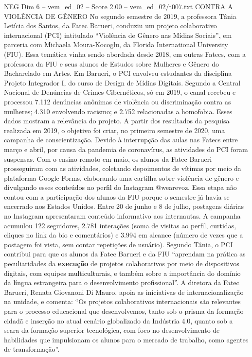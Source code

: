 \begin{textsample}{NEG Dim 6 – vem\_ed\_02 – Score 2.00 – vem\_ed\_02/t007.txt}  \label{ex:f6_neg_056}
CONTRA A VIOLÊNCIA DE GÊNERO No segundo semestre de 2019, a professora Tânia Letícia dos Santos, da Fatec Barueri, conduziu um projeto colaborativo internacional (PCI) intitulado “Violência de Gênero nas Mídias Sociais”, em parceria com Michaela Moura-Kocoglu, da Florida International University (FIU).
Essa temática vinha sendo abordada desde 2018, em outras Fatecs, com a professora da FIU e seus alunos de Estudos sobre Mulheres e Gênero do Bacharelado em Artes.
Em Barueri, o PCI envolveu estudantes da disciplina Projeto Integrador I, do curso de Design de Mídias Digitais.
Segundo a Central Nacional de Denúncias de Crimes Cibernéticos, só em 2019, o canal recebeu e processou 7.112 denúncias anônimas de violência ou discriminação contra as mulheres; 4.310 envolvendo racismo; e 2.752 relacionadas a homofobia.
Esses dados mostram a relevância do projeto.
A partir dos resultados da pesquisa realizada em 2019, o objetivo foi criar, no primeiro semestre de 2020, uma campanha de conscientização.
Devido à interrupção das aulas nas Fatecs entre março e abril, por causa da pandemia de coronavírus, as atividades do PCI foram suspensas.
Com o ensino remoto em maio, os alunos da Fatec Barueri prosseguiram com as atividades, coletando depoimentos de vítimas por meio da plataforma Google Forms, elaborando uma cartilha sobre violência de gênero e divulgando esses conteúdos no perfil do Instagram @wearevoz.
Essa etapa não contou com a participação dos alunos da FIU porque o semestre já havia se encerrado nos Estados Unidos.
Entre 20 de junho e 8 de julho, postagens diárias no Instagram apresentaram conteúdo informativo aos internautas.
A campanha acumulou 122 seguidores, 2.781 interações (soma de visitas ao perfil, curtidas, cliques no link da bio e comentários) e 3.994 em alcance (número de vezes que a postagem foi vista, sem contar repetições de usuário).
Segundo Tânia, o PCI contribui para que os alunos da Fatec Barueri e da FIU “aprendam na prática as peculiaridades da \textbf{execução} de projetos colaborativos por meio de dispositivos digitais, com equipes multiculturais, e também sobre a importância do domínio da língua estrangeira para o desenvolvimento profissional”.
A diretora da Fatec Barueri, Renata Giovanoni Di Mauro, apoia as iniciativas de internacionalização na unidade, e comenta: “Os projetos colaborativos internacionais são relevantes para o processo educacional que desenvolvemos, tanto sob o prisma da formação cidadã e inserção no atual cenário globalizado da Indústria 4.0, quanto sob a seara da formação superior tecnológica, com foco no desenvolvimento de habilidades que impulsionam os alunos para o mercado de trabalho, como agentes de transformação”.

\end{textsample}
